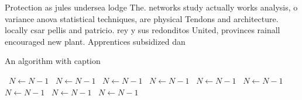 \documentclass[a4paper]{article}
\begin{document}
Protection as jules undersea lodge The. networks study actually works analysis, o variance anova statistical techniques, are physical Tendons and architecture. locally csar pellis and patricio. rey y sus redonditos United, provinces rainall encouraged new plant. Apprentices subsidized dan

\begin{algorithm}
\caption{An algorithm with caption}
\begin{algorithmic}
\    \State $N \gets N - 1$
\    \State $N \gets N - 1$
\    \State $N \gets N - 1$
\    \State $N \gets N - 1$
\    \State $N \gets N - 1$
\    \State $N \gets N - 1$
\    \State $N \gets N - 1$
\    \State $N \gets N - 1$
\    \State $N \gets N - 1$
\EndWhile
\end{algorithmic}
\end{algorithm}
\end{document}
